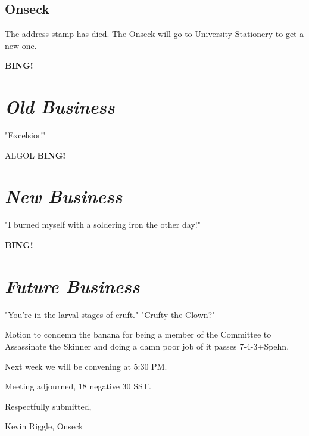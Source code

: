 \documentclass[10pt]{article}
\newcommand{\bing}{{\bf BING!} }
\newcommand{\goto}[1]{\bing \vskip 12pt \section*{{\em{#1}}}}
\begin{document}
\subsection*{Onseck}
The address stamp has died.  The Onseck will go to University Stationery to get a new one.

\goto{Old Business}

"Excelsior!"

ALGOL
\goto{New Business}

"I burned myself with a soldering iron the other day!"

\goto{Future Business}

"You're in the larval stages of cruft."  "Crufty the Clown?"

Motion to condemn the banana for being a member of the Committee to Assassinate the Skinner and
doing a damn poor job of it passes 7-4-3+Spehn.

Next week we will be convening at 5:30 PM.

\vspace{12pt}

\noindent
Meeting adjourned, 18 negative 30 SST.

\vspace{18pt}

\centerline{Respectfully submitted,}
\centerline{Kevin Riggle, Onseck}
\end{document}
